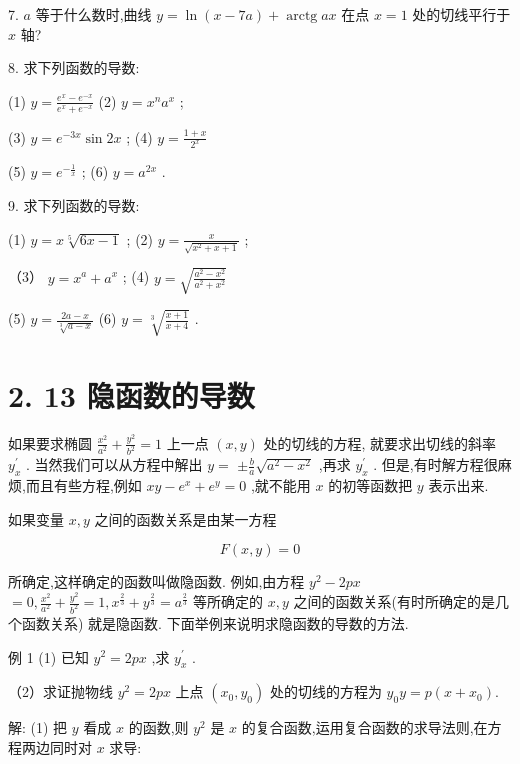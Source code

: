 \documentclass[10pt]{article}
\begin{document}
7. \(a\) 等于什么数时,曲线 \(y = \ln \left( {x - {7a}}\right) + \operatorname{arctg}{ax}\) 在点 \(x = 1\) 处的切线平行于 \(x\) 轴?

8. 求下列函数的导数:

(1) \(y = \frac{{e}^{x} - {e}^{-x}}{{e}^{x} + {e}^{-x}}\) (2) \(y = {x}^{n}{a}^{x}\) ;

(3) \(y = {e}^{-{3x}}\sin {2x}\) ; (4) \(y = \frac{1 + x}{{2}^{x}}\)

(5) \(y = {e}^{-\frac{1}{x}}\) ; (6) \(y = {a}^{2x}\) .

9. 求下列函数的导数:

(1) \(y = x\sqrt[5]{{6x} - 1}\) ; (2) \(y = \frac{x}{\sqrt{{x}^{2} + x + 1}}\) ;

（3） \(y = {x}^{a} + {a}^{x}\) ; (4) \(y = \sqrt{\frac{{a}^{2} - {x}^{2}}{{a}^{2} + {x}^{2}}}\)

(5) \(y = \frac{{2a} - x}{\sqrt[3]{a - x}}\) (6) \(y = \sqrt[3]{\frac{x + 1}{x + 4}}\) .

\section*{2. 13 隐函数的导数}

如果要求椭圆 \(\frac{{x}^{2}}{{a}^{2}} + \frac{{y}^{2}}{{b}^{2}} = 1\) 上一点 \(\left( {x,y}\right)\) 处的切线的方程, 就要求出切线的斜率 \({y}_{x}^{\prime }\) . 当然我们可以从方程中解出 \(y =\) \(\pm \frac{b}{a}\sqrt{{a}^{2} - {x}^{2}}\) ,再求 \({y}_{x}^{\prime }\) . 但是,有时解方程很麻烦,而且有些方程,例如 \({xy} - {e}^{x} + {e}^{y} = 0\) ,就不能用 \(x\) 的初等函数把 \(y\) 表示出来.

如果变量 \(x,y\) 之间的函数关系是由某一方程

\[
F\left( {x,y}\right) = 0
\]

所确定,这样确定的函数叫做隐函数. 例如,由方程 \({y}^{2} - {2px}\) \(= 0,\frac{{x}^{2}}{{a}^{2}} + \frac{{y}^{2}}{{b}^{2}} = 1,{x}^{\frac{2}{3}} + {y}^{\frac{2}{3}} = {a}^{\frac{2}{3}}\) 等所确定的 \(x,y\) 之间的函数关系(有时所确定的是几个函数关系) 就是隐函数. 下面举例来说明求隐函数的导数的方法.

例 1 (1) 已知 \({y}^{2} = {2px}\) ,求 \({y}_{x}^{\prime }\) .

（2）求证抛物线 \({y}^{2} = {2px}\) 上点 \(\left( {{x}_{0},{y}_{0}}\right)\) 处的切线的方程为 \({y}_{0}y = p\left( {x + {x}_{0}}\right) .\)

解: (1) 把 \(y\) 看成 \(x\) 的函数,则 \({y}^{2}\) 是 \(x\) 的复合函数,运用复合函数的求导法则,在方程两边同时对 \(x\) 求导:
\end{document}
